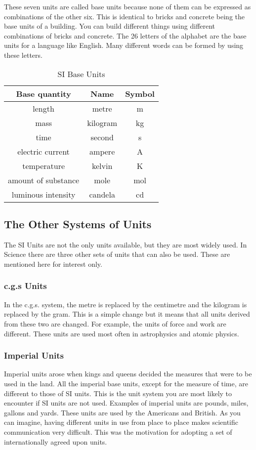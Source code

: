 \documentclass[10pt,a4paper,titlepage,twoside,openright]{report}
\begin{document}
These seven units are called base units because none of them can
be expressed as combinations of the other six. This is identical
to bricks and concrete being the base units of a building. You can
build different things using different combinations of bricks and
concrete. The 26 letters of the alphabet are the base units for a
language like English. Many different words can be formed by using
these letters.

\begin{table}
\centering
\begin{tabular}{|c|c|c|}\hline
\textbf{Base quantity} & \textbf{Name} & \textbf{Symbol} \\
\hline length & metre & m\\ \hline mass & kilogram & kg\\
\hline time & second & s\\ \hline electric current & ampere& A\\
\hline temperature & kelvin & K\\ \hline amount of substance &
mole & mol\\ \hline luminous intensity & candela & cd\\ \hline
\end{tabular}
\caption{SI Base Units}\label{tab:units:SIunits}
\end{table}

\pagebreak[4]
\subsection{The Other Systems of Units}
The SI Units are not the only units available, but they are most
widely used. In Science there are three other sets of units that
can also be used. These are mentioned here for interest only.

\subsubsection{c.g.s Units}
In the c.g.s. system, the metre is replaced by the centimetre and
the kilogram is replaced by the gram. This is a simple change but
it means that all units derived from these two are changed. For
example, the units of force and work are different. These units
are used most often in astrophysics and atomic physics.

\subsubsection{Imperial Units}
Imperial units arose when kings and queens decided the measures
that were to be used in the land. All the imperial base units,
except for the measure of time, are different to those of SI
units. This is the unit system you are most likely to encounter if
SI units are not used. Examples of imperial units are pounds,
miles, gallons and yards. These units are used by the Americans and
British. As you can imagine, having different units in use from
place to place makes scientific communication very difficult. This
was the motivation for adopting a set of internationally agreed
upon units.
\end{document}
